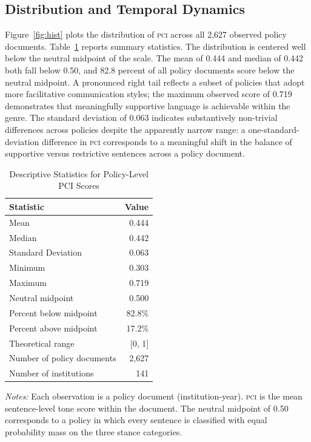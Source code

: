 \documentclass[12pt]{article}
\newcommand{\PCI}{\textsc{pci}}
\begin{document}
\subsection{Distribution and Temporal Dynamics}
\label{sec:distribution}

Figure~\ref{fig:hist} plots the distribution of \PCI{} across all 2,627 observed
policy documents.  Table~\ref{tab:pcistats} reports summary statistics.  The
distribution is centered well below the neutral midpoint of the scale.  The mean of
0.444 and median of 0.442 both fall below 0.50, and 82.8 percent of all policy
documents score below the neutral midpoint.  A pronounced right tail reflects a subset
of policies that adopt more facilitative communication styles; the maximum observed
score of 0.719 demonstrates that meaningfully supportive language is achievable within
the genre.  The standard deviation of 0.063 indicates substantively non-trivial
differences across policies despite the apparently narrow range: a one-standard-deviation
difference in \PCI{} corresponds to a meaningful shift in the balance of supportive
versus restrictive sentences across a policy document.

\begin{table}[H]
\centering
\caption{Descriptive Statistics for Policy-Level PCI Scores}
\label{tab:pcistats}
\begin{threeparttable}
\small
\begin{tabular}{lr}
\toprule
\textbf{Statistic} & \textbf{Value} \\
\midrule
Mean               & 0.444 \\
Median             & 0.442 \\
Standard Deviation & 0.063 \\
Minimum            & 0.303 \\
Maximum            & 0.719 \\
Neutral midpoint   & 0.500 \\
\quad Percent below midpoint & 82.8\% \\
\quad Percent above midpoint & 17.2\% \\
Theoretical range  & [0, 1] \\
Number of policy documents  & 2,627 \\
Number of institutions      & 141 \\
\bottomrule
\end{tabular}
\begin{tablenotes}
\small
\item \textit{Notes:} Each observation is a policy document (institution-year).
  \PCI{} is the mean sentence-level tone score within the document.  The neutral
  midpoint of 0.50 corresponds to a policy in which every sentence is classified
  with equal probability mass on the three stance categories.
\end{tablenotes}
\end{threeparttable}
\end{table}
\end{document}
